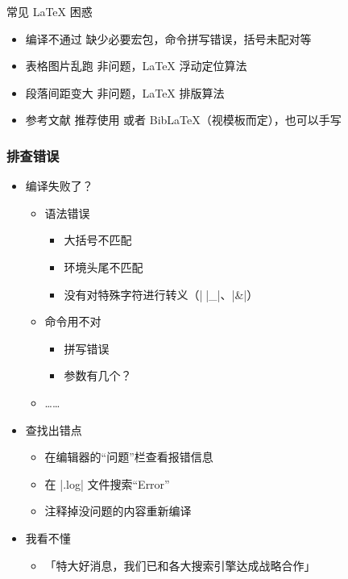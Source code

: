 \begin{frame}{常见 \LaTeX{} 困惑}
  \begin{itemize}
    \item \alert{编译不通过} 缺少必要宏包，命令拼写错误，括号未配对等
    \item \alert{表格图片乱跑} 非问题，\LaTeX{} 浮动定位算法 
    \item \alert{段落间距变大} 非问题，\LaTeX{} 排版算法
    \item \alert{参考文献} 推荐使用 \BibTeX 或者 Bib\LaTeX（视模板而定），也可以手写  
  \end{itemize}
\end{frame}

\begin{frame}[fragile]
  \frametitle{排查错误}
    \begin{itemize}
      \item<+-> 编译失败了？
        \begin{itemize}
          \item 语法错误
            \begin{itemize}
              \item 大括号不匹配
              \item 环境头尾不匹配
              \item 没有对特殊字符进行转义（|\|、|_|、|&|）
            \end{itemize}
  
        \item 命令用不对
          \begin{itemize}
            \item 拼写错误
            \item 参数有几个？
          \end{itemize}
        \item ……
      \end{itemize}
  
      \item<+-> 查找出错点
      \begin{itemize}
        \item 在编辑器的“问题”栏查看报错信息
        \item 在 |.log| 文件搜索“Error”
        \item 注释掉没问题的内容重新编译
      \end{itemize}
  
      \item<+-> 我看不懂
      \begin{itemize}
        \item<+-> \alert{「特大好消息，我们已和各大搜索引擎达成战略合作」}
      \end{itemize}
    \end{itemize}
  \end{frame}

